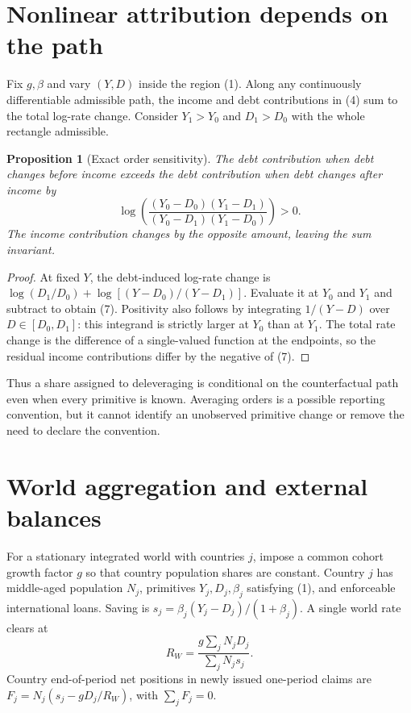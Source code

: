 \documentclass[11pt]{article}
\newtheorem{proposition}[theorem]{Proposition}
\theoremstyle{remark}
\begin{document}
\section{Nonlinear attribution depends on the path}
Fix $g,\beta$ and vary $(Y,D)$ inside the region (1). Along any continuously
differentiable admissible path, the income and debt contributions in (4)
sum to the total log-rate change. Consider $Y_1>Y_0$ and $D_1>D_0$
with the whole rectangle admissible.

\begin{proposition}[Exact order sensitivity]
The debt contribution when debt changes before income exceeds the debt
contribution when debt changes after income by
\[
 \log\!\left(
 \frac{(Y_0-D_0)(Y_1-D_1)}{(Y_0-D_1)(Y_1-D_0)}\right)>0.           \tag{7}
\]
The income contribution changes by the opposite amount, leaving the
sum invariant.
\end{proposition}
\begin{proof}
At fixed $Y$, the debt-induced log-rate change is
$\log(D_1/D_0)+\log[(Y-D_0)/(Y-D_1)]$. Evaluate it at $Y_0$ and
$Y_1$ and subtract to obtain (7). Positivity also follows by integrating
$1/(Y-D)$ over $D\in[D_0,D_1]$: this integrand is strictly larger at
$Y_0$ than at $Y_1$. The total rate change is the difference of a
single-valued function at the endpoints, so the residual income
contributions differ by the negative of (7).
\end{proof}
Thus a share assigned to deleveraging is conditional on the counterfactual
path even when every primitive is known. Averaging orders is a possible
reporting convention, but it cannot identify an unobserved primitive
change or remove the need to declare the convention.

\section{World aggregation and external balances}
For a stationary integrated world with countries $j$, impose a common
cohort growth factor $g$ so that country population shares are constant.
Country $j$ has middle-aged population $N_j$, primitives $Y_j,D_j,\beta_j$
satisfying (1), and enforceable international loans. Saving is
$s_j=\beta_j(Y_j-D_j)/(1+\beta_j)$. A single world rate clears at
\[
 R_W=\frac{g\sum_jN_jD_j}{\sum_jN_js_j}.                           \tag{8}
\]
Country end-of-period net positions in newly issued one-period claims are
$F_j=N_j(s_j-gD_j/R_W)$, with $\sum_jF_j=0$.
\end{document}
